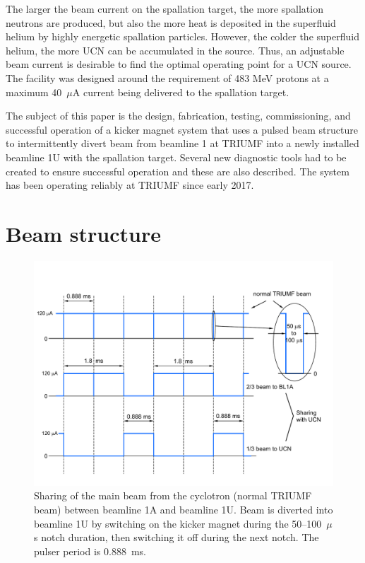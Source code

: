 \documentclass[aps,prab,twocolumn,superscriptaddress]{revtex4-1}
\begin{document}
The larger the beam current on the spallation target, the more spallation neutrons are produced, but also the more heat is deposited in the superfluid helium by highly energetic spallation particles. However, the colder the superfluid helium, the more UCN can be accumulated in the source. Thus, an adjustable beam current is desirable to find the optimal operating point for a UCN source.  The facility was designed around the requirement of 483 MeV protons at a maximum 40~$\mu$A current being delivered to the spallation target.

The subject of this paper is the design, fabrication,
testing, commissioning, and successful operation of a kicker magnet system that uses a pulsed beam structure
to intermittently divert beam from beamline 1 at TRIUMF into a newly installed beamline 1U with the spallation target.
Several new diagnostic tools had to be created to ensure successful
operation and these are also described.  The system has been
operating reliably at TRIUMF since early 2017.

\section{Beam structure}

\begin{figure}%
  \includegraphics[width=\linewidth]{WDR-kicker-beam-sharing-v4.pdf}
  \caption{Sharing of the main beam from the cyclotron (normal TRIUMF
    beam) between beamline 1A and beamline 1U.
    Beam is diverted into beamline 1U by switching on the kicker magnet
    during the 50--100~$\mu$s notch duration, then switching it off
    during the next notch. The pulser period is 0.888~ms.}
  \label{fig:beam-sharing}
\end{figure}
\end{document}
